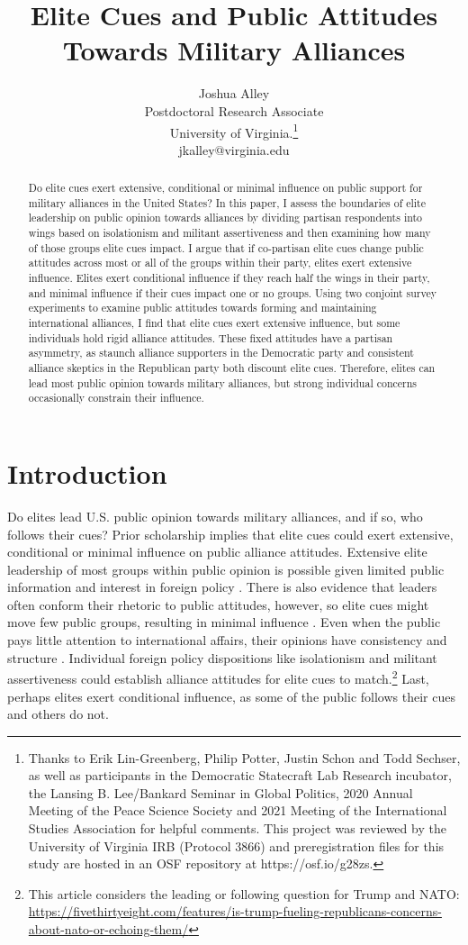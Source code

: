 \documentclass[12pt]{article}
\title{\textbf{Elite Cues and Public Attitudes Towards Military Alliances}}
\author{Joshua Alley \\
Postdoctoral Research Associate \\
University of Virginia.\thanks{Thanks to Erik Lin-Greenberg, Philip Potter, Justin Schon and Todd Sechser, as well as participants in the Democratic Statecraft Lab Research incubator, the Lansing B. Lee/Bankard Seminar in Global Politics, 2020 Annual Meeting of the Peace Science Society and 2021 Meeting of the International Studies Association for helpful comments. 
This project was reviewed by the University of Virginia IRB (Protocol 3866) and preregistration files for this study are hosted in an OSF repository at https://osf.io/g28zs.} \\
jkalley@virginia.edu
}
\date{}
\begin{document}
\maketitle 

\doublespace 

\begin{abstract}
Do elite cues exert extensive, conditional or minimal influence on public support for military alliances in the United States? 
In this paper, I assess the boundaries of elite leadership on public opinion towards alliances by dividing partisan respondents into wings based on isolationism and militant assertiveness and then examining how many of those groups elite cues impact. 
I argue that if co-partisan elite cues change public attitudes across most or all of the groups within their party, elites exert extensive influence. 
Elites exert conditional influence if they reach half the wings in their party, and minimal influence if their cues impact one or no groups.
Using two conjoint survey experiments to examine public attitudes towards forming and maintaining international alliances, I find that elite cues exert extensive influence, but some individuals hold rigid alliance attitudes. 
These fixed attitudes have a partisan asymmetry, as staunch alliance supporters in the Democratic party and consistent alliance skeptics in the Republican party both discount elite cues.  
Therefore, elites can lead most public opinion towards military alliances, but strong individual concerns occasionally constrain their influence.  
\end{abstract}


\newpage 


\section{Introduction}


Do elites lead U.S. public opinion towards military alliances, and if so, who follows their cues?
Prior scholarship implies that elite cues could exert extensive, conditional or minimal influence on public alliance attitudes.
Extensive elite leadership of most groups within public opinion is possible given limited public information and interest in foreign policy \citep{Canes-Wrone2006, BaumPotter2008, Druckman2014}.
There is also evidence that leaders often conform their rhetoric to public attitudes, however, so elite cues might move few public groups, resulting in minimal influence \citep{Barberaetal2019, HagerHilbig2020}.
Even when the public pays little attention to international affairs, their opinions have consistency and structure \citep{Holsti1992, PageShapiro1992}.
Individual foreign policy dispositions like isolationism and militant assertiveness \citep{Herrmannetal1999, KertzerZeitzoff2017} could establish alliance attitudes for elite cues to match.\footnote{This article considers the leading or following question for Trump and NATO: \url{https://fivethirtyeight.com/features/is-trump-fueling-republicans-concerns-about-nato-or-echoing-them/}}
Last, perhaps elites exert conditional influence, as some of the public follows their cues and others do not. 
\end{document}
